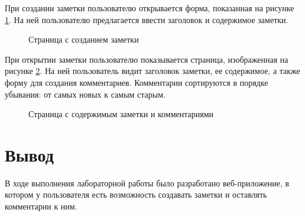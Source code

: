 \documentclass[a4paper, 14pt]{extarticle}
\begin{document}
При создании заметки пользователю открывается форма, показанная на рисунке
\ref{fig:note-form.png}. На ней пользователю предлагается ввести заголовок и
содержимое заметки.

\begin{figure}[H]
  \centering
  \caption{Страница с созданием заметки}
  \label{fig:note-form.png}
\end{figure}

При открытии заметки пользователю показывается страница, изображенная на рисунке
\ref{fig:note.png}. На ней пользователь видит заголовок заметки, ее содержимое,
а также форму для создания комментариев. Комментарии сортируются в порядке
убывания: от самых новых к самым старым.

\begin{figure}[H]
  \centering
  \caption{Страница с содержимым заметки и комментариями}
  \label{fig:note.png}
\end{figure}

\section{Вывод}

В ходе выполнения лабораторной работы было разработано веб-приложение, в котором
у пользователя есть возможность создавать заметки и оставлять комментарии к ним.
\end{document}
